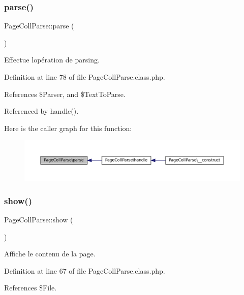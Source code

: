 \subsubsection{\texorpdfstring{parse()}{parse()}}
{\footnotesize\ttfamily Page\+Coll\+Parse\+::parse (\begin{DoxyParamCaption}{ }\end{DoxyParamCaption})\hspace{0.3cm}{\ttfamily [protected]}}

Effectue l\textquotesingle{}opération de parsing. 

Definition at line 78 of file Page\+Coll\+Parse.\+class.\+php.



References \$\+Parser, and \$\+Text\+To\+Parse.



Referenced by handle().

Here is the caller graph for this function\+:\nopagebreak
\begin{figure}[H]
\begin{center}
\leavevmode
\includegraphics[width=350pt]{class_page_coll_parse_a1c597aac0c341568337b177194428178_icgraph}
\end{center}
\end{figure}
\mbox{\label{class_page_coll_parse_a599391c515aee215dbd1d433c69837b7}} 
\subsubsection{\texorpdfstring{show()}{show()}}
{\footnotesize\ttfamily Page\+Coll\+Parse\+::show (\begin{DoxyParamCaption}{ }\end{DoxyParamCaption})\hspace{0.3cm}{\ttfamily [protected]}}

Affiche le contenu de la page. 

Definition at line 67 of file Page\+Coll\+Parse.\+class.\+php.



References \$\+File.



